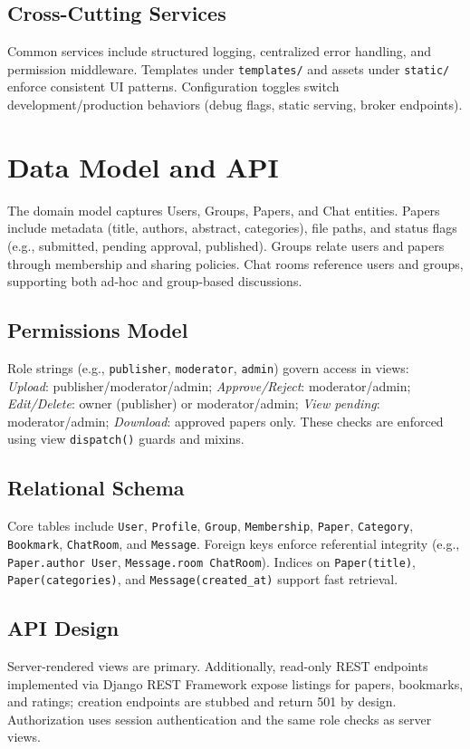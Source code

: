 \documentclass[conference]{IEEEtran}
\begin{document}
\subsection{Cross-Cutting Services}
Common services include structured logging, centralized error handling, and permission middleware. Templates under \texttt{templates/} and assets under \texttt{static/} enforce consistent UI patterns. Configuration toggles switch development/production behaviors (debug flags, static serving, broker endpoints).

\section{Data Model and API}
The domain model captures Users, Groups, Papers, and Chat entities. Papers include metadata (title, authors, abstract, categories), file paths, and status flags (e.g., submitted, pending approval, published). Groups relate users and papers through membership and sharing policies. Chat rooms reference users and groups, supporting both ad-hoc and group-based discussions.

\subsection{Permissions Model}
Role strings (e.g., \texttt{publisher}, \texttt{moderator}, \texttt{admin}) govern access in views:\\
\textit{Upload}: publisher/moderator/admin; \textit{Approve/Reject}: moderator/admin; \textit{Edit/Delete}: owner (publisher) or moderator/admin; \textit{View pending}: moderator/admin; \textit{Download}: approved papers only. These checks are enforced using view \texttt{dispatch()} guards and mixins.

\subsection{Relational Schema}
Core tables include \texttt{User}, \texttt{Profile}, \texttt{Group}, \texttt{Membership}, \texttt{Paper}, \texttt{Category}, \texttt{Bookmark}, \texttt{ChatRoom}, and \texttt{Message}. Foreign keys enforce referential integrity (e.g., \texttt{Paper.author \textrightarrow{} User}, \texttt{Message.room \textrightarrow{} ChatRoom}). Indices on \texttt{Paper(title)}, \texttt{Paper(categories)}, and \texttt{Message(created\_at)} support fast retrieval.

\subsection{API Design}
Server-rendered views are primary. Additionally, read-only REST endpoints implemented via Django REST Framework expose listings for papers, bookmarks, and ratings; creation endpoints are stubbed and return 501 by design. Authorization uses session authentication and the same role checks as server views.
\end{document}
